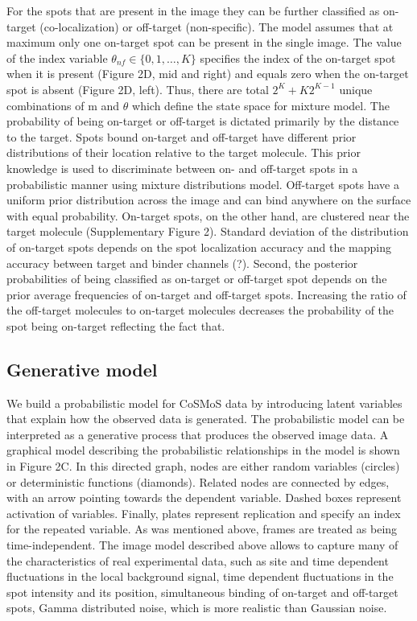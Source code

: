 For the spots that are present in the image they can be further classified as on-target (co-localization) or off-target (non-specific). The model assumes that at maximum only one on-target spot can be present in the single image. The value of the index variable $\theta_{nf} \in \{0,1,\dots,K\}$ specifies the index of the on-target spot when it is present (Figure 2D, mid and right) and equals zero when the on-target spot is absent (Figure 2D, left). Thus, there are total $2^K + K2^{K-1}$ unique combinations of $\mathrm{m}$ and $\theta$ which define the state space for mixture model. The probability of being on-target or off-target is dictated primarily by the distance to the target. Spots bound on-target and off-target have different prior distributions of their location relative to the target molecule. This prior knowledge is used to discriminate between on- and off-target spots in a probabilistic manner using mixture distributions model. Off-target spots have a uniform prior distribution across the image and can bind anywhere on the surface with equal probability. On-target spots, on the other hand, are clustered near the target molecule (Supplementary Figure 2). Standard deviation of the distribution of on-target spots depends on the spot localization accuracy and the mapping accuracy between target and binder channels (?). Second, the posterior probabilities of being classified as on-target or off-target spot depends on the prior average frequencies of on-target and off-target spots. Increasing the ratio of the off-target molecules to on-target molecules decreases the probability of the spot being on-target reflecting the fact that.

\subsection{Generative model}

We build a probabilistic model for CoSMoS data by introducing latent variables that explain how the observed data is generated. The probabilistic model can be interpreted as a generative process that produces the observed image data. A graphical model describing the probabilistic relationships in the model is shown in Figure 2C. In this directed graph, nodes are either random variables (circles) or deterministic functions (diamonds). Related nodes are connected by edges, with an arrow pointing towards the dependent variable. Dashed boxes represent activation of variables. Finally, plates represent replication and specify an index for the repeated variable. As was mentioned above, frames are treated as being time-independent. The image model described above allows to capture many of the characteristics of real experimental data, such as site and time dependent fluctuations in the local background signal, time dependent fluctuations in the spot intensity and its position, simultaneous binding of on-target and off-target spots, Gamma distributed noise, which is more realistic than Gaussian noise.

